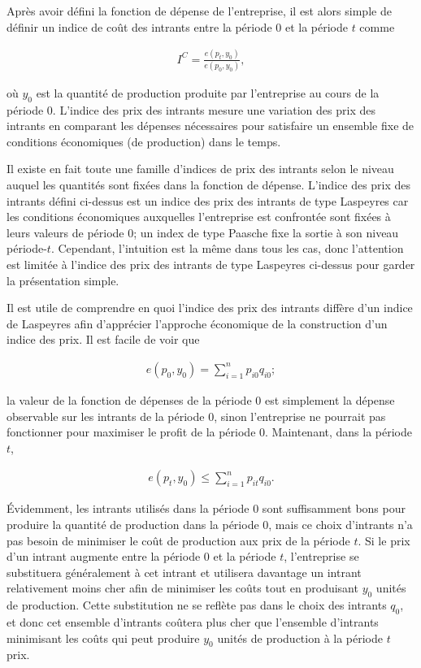 \documentclass[]{article}
\begin{document}
Après avoir défini la fonction de dépense de l'entreprise, il est alors simple de définir un indice de coût des intrants entre la période 0 et la période \(t\) comme

\begin{align*}
I^{C} = \frac{e(p_{t}, y_{0})}{e(p_{0}, y_{0})},
\end{align*}

où \(y_{0}\) est la quantité de production produite par l'entreprise au cours de la période 0. L'indice des prix des intrants mesure une variation des prix des intrants en comparant les dépenses nécessaires pour satisfaire un ensemble fixe de conditions économiques (de production) dans le temps.

Il existe en fait toute une famille d'indices de prix des intrants selon le niveau auquel les quantités sont fixées dans la fonction de dépense. L'indice des prix des intrants défini ci-dessus est un indice des prix des intrants de type Laspeyres car les conditions économiques auxquelles l'entreprise est confrontée sont fixées à leurs valeurs de période 0; un index de type Paasche fixe la sortie à son niveau période-\(t\). Cependant, l'intuition est la même dans tous les cas, donc l'attention est limitée à l'indice des prix des intrants de type Laspeyres ci-dessus pour garder la présentation simple.

Il est utile de comprendre en quoi l'indice des prix des intrants diffère d'un indice de Laspeyres afin d'apprécier l'approche économique de la construction d'un indice des prix. Il est facile de voir que

\begin{align*}
e(p_{0}, y_{0}) = \sum_{i = 1}^{n} p_{i0} q_{i0};
\end{align*}

la valeur de la fonction de dépenses de la période 0 est simplement la dépense observable sur les intrants de la période 0, sinon l'entreprise ne pourrait pas fonctionner pour maximiser le profit de la période 0. Maintenant, dans la période \(t\),

\begin{align*}
e(p_{t}, y_{0}) \leq \sum_{i = 1}^{n} p_{it} q_{i0}.
\end{align*}

Évidemment, les intrants utilisés dans la période 0 sont suffisamment bons pour produire la quantité de production dans la période 0, mais ce choix d'intrants n'a pas besoin de minimiser le coût de production aux prix de la période \(t\). Si le prix d'un intrant augmente entre la période 0 et la période \(t\), l'entreprise se substituera généralement à cet intrant et utilisera davantage un intrant relativement moins cher afin de minimiser les coûts tout en produisant \(y_{0}\) unités de production. Cette substitution ne se reflète pas dans le choix des intrants \(q_{0}\), et donc cet ensemble d'intrants coûtera plus cher que l'ensemble d'intrants minimisant les coûts qui peut produire \(y_{0}\) unités de production à la période \(t\) prix.
\end{document}
